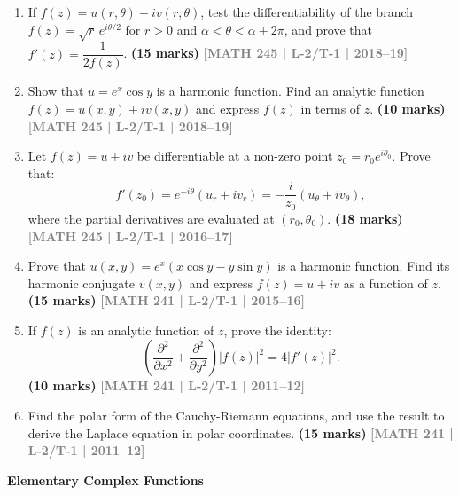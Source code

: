 \documentclass[12pt,a3paper]{article}
\newcommand{\yr}[1]{\hfill\textcolor{gray}{\small\textbf{[#1]}}}
\newcommand{\mk}[1]{\textcolor{orange!70!black}{\small\textbf{(#1 marks)}}}
\newcommand{\subtopic}[2]{%
  \vspace{10pt}
  \noindent\begin{tcolorbox}[colback=#1!8,colframe=#1,boxrule=0.6pt,arc=4pt,
    left=6pt,right=6pt,top=4pt,bottom=4pt]
    \small\bfseries\textcolor{#1}{#2}
  \end{tcolorbox}
  \vspace{2pt}
}
\begin{document}
\begin{enumerate}
\item If $f(z)=u(r,\theta)+ iv(r,\theta)$, test the differentiability of the branch $f(z)=\sqrt{r}\,e^{i\theta/2}$ for $r>0$ and $\alpha<\theta<\alpha+2\pi$, and prove that $f'(z)=\dfrac{1}{2f(z)}$.
\mk{15} \yr{MATH 245 | L-2/T-1 | 2018--19}


\item Show that $u=e^{x}\cos y$ is a harmonic function. Find an analytic function $f(z)=u(x,y)+iv(x,y)$ and express $f(z)$ in terms of $z$.
\mk{10} \yr{MATH 245 | L-2/T-1 | 2018--19}



\item Let $f(z)=u+iv$ be differentiable at a non-zero point $z_{0}=r_{0}e^{i\theta_{0}}$. Prove that:
\[
f'(z_{0})=e^{-i\theta}(u_{r}+iv_{r})=-\frac{i}{z_{0}}(u_{\theta}+iv_{\theta}),
\]
where the partial derivatives are evaluated at $(r_{0},\theta_{0})$.
\mk{18} \yr{MATH 245 | L-2/T-1 | 2016--17}



\item Prove that $u(x,y)=e^{x}(x\cos y - y\sin y)$ is a harmonic function. Find its harmonic conjugate $v(x,y)$ and express $f(z)=u+iv$ as a function of $z$.
\mk{15} \yr{MATH 241 | L-2/T-1 | 2015--16}



\item If $f(z)$ is an analytic function of $z$, prove the identity:
\[
\left(\frac{\partial^{2}}{\partial x^{2}}+\frac{\partial^{2}}{\partial y^{2}}\right)|f(z)|^{2} = 4|f'(z)|^{2}.
\]
\mk{10} \yr{MATH 241 | L-2/T-1 | 2011--12}


\item Find the polar form of the Cauchy-Riemann equations, and use the result to derive the Laplace equation in polar coordinates.
\mk{15} \yr{MATH 241 | L-2/T-1 | 2011--12}


\end{enumerate}

\subtopic{cE}{Elementary Complex Functions}
\label{sub:s5-elementary}
\end{document}
